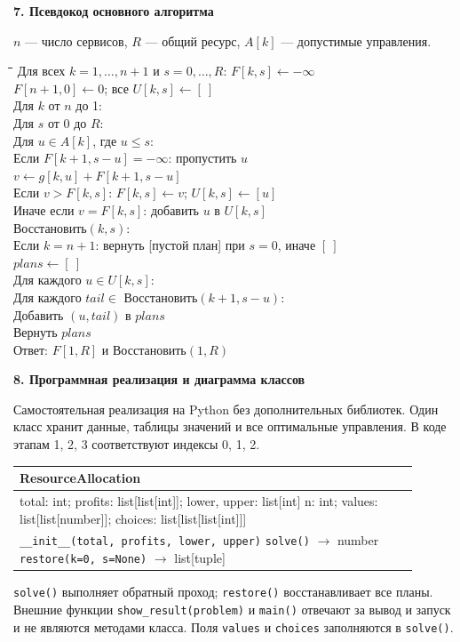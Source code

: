 \documentclass[12pt,a4paper]{article}
\newcommand{\head}[1]{\medskip\textbf{#1}\par}
\begin{document}
\newpage
\head{7. Псевдокод основного алгоритма}
$n$ --- число сервисов, $R$ --- общий ресурс, $A[k]$ --- допустимые управления.
\begin{tabbing}
\quad\=\quad\=\quad\=\quad\=\kill
Для всех $k=1,\ldots,n+1$ и $s=0,\ldots,R$: $F[k,s]\gets-\infty$\\
$F[n+1,0]\gets0$; все $U[k,s]\gets[\ ]$\\
Для $k$ от $n$ до 1:\\
\>Для $s$ от 0 до $R$:\\
\>\>Для $u\in A[k]$, где $u\le s$:\\
\>\>\>Если $F[k+1,s-u]=-\infty$: пропустить $u$\\
\>\>\>$v\gets g[k,u]+F[k+1,s-u]$\\
\>\>\>Если $v>F[k,s]$: $F[k,s]\gets v$; $U[k,s]\gets[u]$\\
\>\>\>Иначе если $v=F[k,s]$: добавить $u$ в $U[k,s]$\\
Восстановить$(k,s)$:\\
\>Если $k=n+1$: вернуть [пустой план] при $s=0$, иначе $[\ ]$\\
\>$plans\gets[\ ]$\\
\>Для каждого $u\in U[k,s]$:\\
\>\>Для каждого $tail\in$ Восстановить$(k+1,s-u)$:\\
\>\>\>Добавить $(u,tail)$ в $plans$\\
\>Вернуть $plans$\\
Ответ: $F[1,R]$ и Восстановить$(1,R)$
\end{tabbing}

\head{8. Программная реализация и диаграмма классов}
Самостоятельная реализация на Python без дополнительных библиотек.
Один класс хранит данные, таблицы значений и все оптимальные управления.
В коде этапам 1, 2, 3 соответствуют индексы 0, 1, 2.
\begin{center}\begin{tabular}{|p{0.89\linewidth}|}\hline
\centering\textbf{ResourceAllocation}\tabularnewline\hline
total: int; profits: list[list[int]]; lower, upper: list[int]\newline
n: int; values: list[list[number]]; choices: list[list[list[int]]]\tabularnewline\hline
\texttt{\_\_init\_\_(total, profits, lower, upper)}\newline
\texttt{solve()} $\to$ number\newline
\texttt{restore(k=0, s=None)} $\to$ list[tuple]\tabularnewline\hline
\end{tabular}\end{center}
\texttt{solve()} выполняет обратный проход; \texttt{restore()} восстанавливает
все планы. Внешние функции \texttt{show\_result(problem)} и \texttt{main()}
отвечают за вывод и запуск и не являются методами класса.
Поля \texttt{values} и \texttt{choices} заполняются в \texttt{solve()}.
\end{document}
